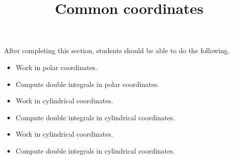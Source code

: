 \documentclass{ximera}
\title{Common coordinates}
\begin{document}
\begin{abstract}
\end{abstract}
\maketitle

\begin{sectionOutcomes}

After completing this section, students should be able to do the following.

\begin{itemize}
\item Work in polar coordinates.
\item Compute double integrals in polar coordinates.
\item Work in cylindrical coordinates.
\item Compute double integrals in cylindrical coordinates.
\item Work in cylindrical coordinates.
\item Compute double integrals in cylindrical coordinates.
\end{itemize}

\end{sectionOutcomes}
\end{document}

